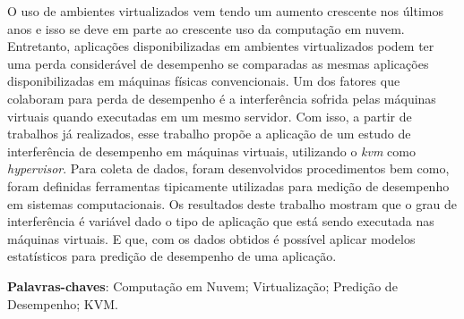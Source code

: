 \begin{resumo}
 O uso de ambientes virtualizados vem tendo um aumento crescente nos últimos anos e isso se deve em parte ao crescente uso da computação em nuvem. Entretanto, aplicações disponibilizadas em ambientes virtualizados podem ter uma perda considerável de desempenho se comparadas as mesmas aplicações disponibilizadas em máquinas físicas convencionais. Um dos fatores que colaboram para perda de desempenho é a interferência sofrida pelas máquinas virtuais quando executadas em um mesmo servidor. Com isso, a partir de trabalhos já realizados, esse trabalho propõe a aplicação de um estudo de interferência de desempenho em máquinas virtuais, utilizando o \textit{kvm} como \textit{hypervisor}. Para coleta de dados, foram desenvolvidos procedimentos bem como, foram definidas ferramentas tipicamente utilizadas para medição de desempenho em sistemas computacionais.
Os resultados deste trabalho mostram que o grau de interferência é variável dado o tipo de aplicação que está sendo executada nas máquinas virtuais. E que, com os dados obtidos é possível aplicar modelos estatísticos para predição de desempenho de uma aplicação.  %




 \vspace{\onelineskip}
    
 \noindent
 \textbf{Palavras-chaves}: Computação em Nuvem; Virtualização; Predição de Desempenho; KVM.
\end{resumo}
